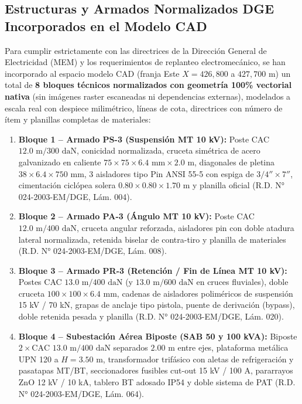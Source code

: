 \subsection{Estructuras y Armados Normalizados DGE Incorporados en el Modelo CAD}
Para cumplir estrictamente con las directrices de la Dirección General de Electricidad (MEM) y los requerimientos de replanteo electromecánico, se han incorporado al espacio modelo CAD (franja Este $X = 426,800$ a $427,700\text{ m}$) un total de \textbf{8 bloques técnicos normalizados con geometría 100\% vectorial nativa} (sin imágenes raster escaneadas ni dependencias externas), modelados a escala real con despiece milimétrico, líneas de cota, directrices con número de ítem y planillas completas de materiales:
\begin{enumerate}
    \item \textbf{Bloque 1 -- Armado PS-3 (Suspensión MT 10 kV):} Poste CAC $12.0\text{ m} / 300\text{ daN}$, conicidad normalizada, cruceta simétrica de acero galvanizado en caliente $75 \times 75 \times 6.4\text{ mm} \times 2.0\text{ m}$, diagonales de pletina $38 \times 6.4 \times 750\text{ mm}$, 3 aisladores tipo Pin ANSI 55-5 con espiga de $3/4'' \times 7''$, cimentación ciclópea solera $0.80 \times 0.80 \times 1.70\text{ m}$ y planilla oficial (R.D. N° 024-2003-EM/DGE, Lám. 004).
    \item \textbf{Bloque 2 -- Armado PA-3 (Ángulo MT 10 kV):} Poste CAC $12.0\text{ m} / 400\text{ daN}$, cruceta angular reforzada, aisladores pin con doble atadura lateral normalizada, retenida biselar de contra-tiro y planilla de materiales (R.D. N° 024-2003-EM/DGE, Lám. 008).
    \item \textbf{Bloque 3 -- Armado PR-3 (Retención / Fin de Línea MT 10 kV):} Postes CAC $13.0\text{ m} / 400\text{ daN}$ (y $13.0\text{ m} / 600\text{ daN}$ en cruces fluviales), doble cruceta $100 \times 100 \times 6.4\text{ mm}$, cadenas de aisladores poliméricos de suspensión 15 kV / 70 kN, grapas de anclaje tipo pistola, puente de derivación (bypass), doble retenida pesada y planilla (R.D. N° 024-2003-EM/DGE, Lám. 020).
    \item \textbf{Bloque 4 -- Subestación Aérea Biposte (SAB 50 y 100 kVA):} Biposte $2 \times \text{CAC } 13.0\text{ m} / 400\text{ daN}$ separados $2.00\text{ m}$ entre ejes, plataforma metálica UPN 120 a $H = 3.50\text{ m}$, transformador trifásico con aletas de refrigeración y pasatapas MT/BT, seccionadores fusibles cut-out 15 kV / 100 A, pararrayos ZnO 12 kV / 10 kA, tablero BT adosado IP54 y doble sistema de PAT (R.D. N° 024-2003-EM/DGE, Lám. 064).

\end{enumerate}
